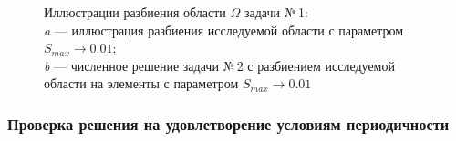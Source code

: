 \documentclass[12pt, a4paper]{article}
\begin{document}
\begin{figure}[h]
\begin{center}
				\end{center} 
				\vspace*{-2.0mm} 
				\caption{Иллюстрации разбиения области $\Omega$ задачи №\,1:\\
					\textit{a} --- иллюстрация разбиения исследуемой области с параметром $S_{max} \rightarrow 0.01$; \\
					\textit{b} --- численное решение задачи №\,2 с разбиением исследуемой области на  элементы с параметром $S_{max} \rightarrow 0.01$ \\
				} 
			\end{figure}
			\vspace*{-10mm}
			\subsubsection{Проверка решения на удовлетворение условиям периодичности}
			
\end{document}
